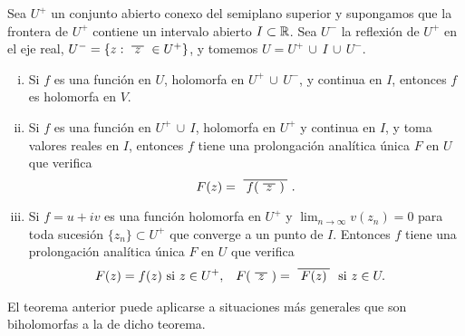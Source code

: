 \begin{theorem} Sea $U^+$ un conjunto abierto conexo del semiplano superior y supongamos que la frontera de $U^+$ contiene un intervalo abierto $I \subset \mathbb{R}$. Sea $U^-$ la reflexión de $U^+$ en el eje real, $U^- = \{z: \xbar{z} \in U^+\}$, y  tomemos $U = U^+ \, \cup \, I \, \cup \, U^-$.
    \begin{enumerate}[(i)]
        \item Si $f$ es una función en $U$, holomorfa en $U^+ \, \cup \, U^-$, y continua en $I$, entonces $f$ es holomorfa en $V$.

        \item Si $f$ es una función en $U^+ \, \cup \, I$, holomorfa en $U^+$ y continua en $I$, y toma valores reales en $I$, entonces $f$ tiene una prolongación analítica única $F$ en $U$ que verifica
            \begin{equation*}
                F(z) = \xbar{f(\xbar{z})}.
            \end{equation*}

        \item Si $f = u + iv$ es una función holomorfa en $U^+$ y $\lim_{n \to \infty} v(z_n) = 0$ para toda sucesión $\{z_n\}\subset U^+$ que converge a un punto de $I$. Entonces $f$ tiene una prolongación analítica única $F$ en $U$ que verifica
            \begin{align*}
                F(z) &= f(z) \text{ si } z\in U^+, & F(\xbar{z}) &= \xbar{F(z)} \text{ si } z\in U.
            \end{align*}
    \end{enumerate}
\end{theorem}

El teorema anterior puede aplicarse a situaciones más generales que son biholomorfas a la de dicho teorema. \\

